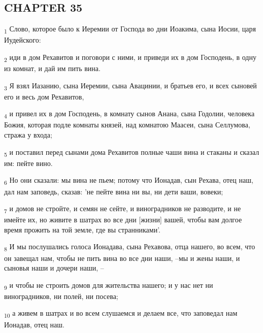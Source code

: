 \subsection{CHAPTER 35}
\begin{tcolorbox}
\textsubscript{1} Слово, которое было к Иеремии от Господа во дни Иоакима, сына Иосии, царя Иудейского:
\end{tcolorbox}
\begin{tcolorbox}
\textsubscript{2} иди в дом Рехавитов и поговори с ними, и приведи их в дом Господень, в одну из комнат, и дай им пить вина.
\end{tcolorbox}
\begin{tcolorbox}
\textsubscript{3} Я взял Иазанию, сына Иеремии, сына Авацинии, и братьев его, и всех сыновей его и весь дом Рехавитов,
\end{tcolorbox}
\begin{tcolorbox}
\textsubscript{4} и привел их в дом Господень, в комнату сынов Анана, сына Годолии, человека Божия, которая подле комнаты князей, над комнатою Маасеи, сына Селлумова, стража у входа;
\end{tcolorbox}
\begin{tcolorbox}
\textsubscript{5} и поставил перед сынами дома Рехавитов полные чаши вина и стаканы и сказал им: пейте вино.
\end{tcolorbox}
\begin{tcolorbox}
\textsubscript{6} Но они сказали: мы вина не пьем; потому что Ионадав, сын Рехава, отец наш, дал нам заповедь, сказав: 'не пейте вина ни вы, ни дети ваши, вовеки;
\end{tcolorbox}
\begin{tcolorbox}
\textsubscript{7} и домов не стройте, и семян не сейте, и виноградников не разводите, и не имейте их, но живите в шатрах во все дни [жизни] вашей, чтобы вам долгое время прожить на той земле, где вы странниками'.
\end{tcolorbox}
\begin{tcolorbox}
\textsubscript{8} И мы послушались голоса Ионадава, сына Рехавова, отца нашего, во всем, что он завещал нам, чтобы не пить вина во все дни наши, --мы и жены наши, и сыновья наши и дочери наши, --
\end{tcolorbox}
\begin{tcolorbox}
\textsubscript{9} и чтобы не строить домов для жительства нашего; и у нас нет ни виноградников, ни полей, ни посева;
\end{tcolorbox}
\begin{tcolorbox}
\textsubscript{10} а живем в шатрах и во всем слушаемся и делаем все, что заповедал нам Ионадав, отец наш.
\end{tcolorbox}
